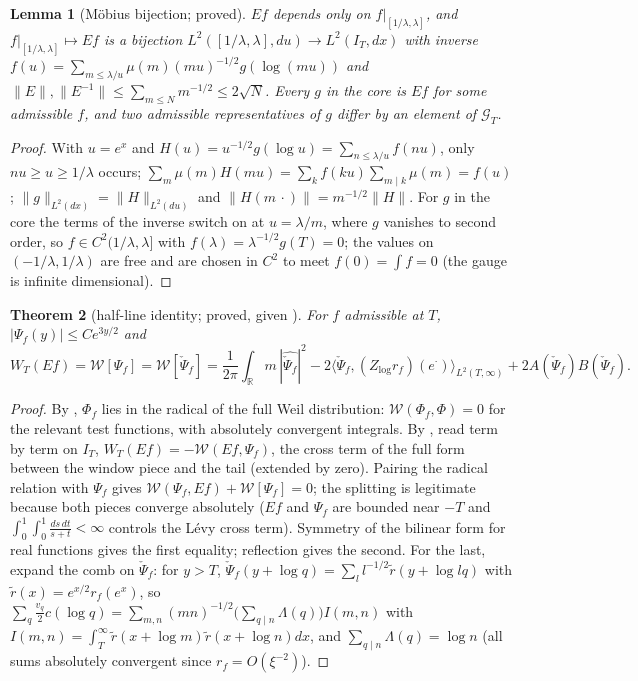 \documentclass[11pt]{amsart}
\newtheorem{theorem}{Theorem}[section]
\newtheorem{lemma}[theorem]{Lemma}
\theoremstyle{definition}
\theoremstyle{remark}
\newcommand{\R}{\mathbb R}
\newcommand{\IT}{I_T}
\begin{document}
\begin{lemma}[M\"obius bijection; proved]\label{lem:ext-mob}
$Ef$ depends only on $f|_{[1/\lambda,\lambda]}$, and $f|_{[1/\lambda,\lambda]}\mapsto Ef$ is a bijection
$L^2([1/\lambda,\lambda],du)\to L^2(\IT,dx)$ with inverse $f(u)=\sum_{m\le\lambda/u}\mu(m)(mu)^{-1/2}g(\log(mu))$ and
$\|E\|,\|E^{-1}\|\le\sum_{m\le N}m^{-1/2}\le2\sqrt N$. Every $g$ in the core is $Ef$ for some admissible $f$, and two
admissible representatives of $g$ differ by an element of $\mathcal G_T$.
\end{lemma}
\begin{proof}
With $u=e^x$ and $H(u)=u^{-1/2}g(\log u)=\sum_{n\le\lambda/u}f(nu)$, only $nu\ge u\ge1/\lambda$ occurs;
$\sum_m\mu(m)H(mu)=\sum_kf(ku)\sum_{m\mid k}\mu(m)=f(u)$; $\|g\|_{L^2(dx)}=\|H\|_{L^2(du)}$ and $\|H(m\,\cdot)\|=m^{-1/2}\|H\|$.
For $g$ in the core the terms of the inverse switch on at $u=\lambda/m$, where $g$ vanishes to second order, so
$f\in C^2(1/\lambda,\lambda]$ with $f(\lambda)=\lambda^{-1/2}g(T)=0$; the values on $(-1/\lambda,1/\lambda)$ are free and are
chosen in $C^2$ to meet $f(0)=\int f=0$ (the gauge is infinite dimensional).
\end{proof}

\begin{theorem}[{half-line identity; proved, given \cite[Lemmas~4.2--4.4, Thm.~4.5]{Guo2026}}]\label{thm:ext-half}
For $f$ admissible at $T$, $|\Psi_f(y)|\le Ce^{3y/2}$ and
\[
W_T(Ef)=\mathcal W[\Psi_f]=\mathcal W[\check\Psi_f]
=\frac1{2\pi}\int_\R m\,|\widehat{\check\Psi_f}|^2-2\big\langle\check\Psi_f,(Z_{\log}r_f)(e^{\cdot})\big\rangle_{L^2(T,\infty)}
+2A(\check\Psi_f)B(\check\Psi_f).
\]
\end{theorem}
\begin{proof}
By \cite[Lemma~4.4]{Guo2026}, $\Phi_f$ lies in the radical of the full Weil distribution: $\mathcal W(\Phi_f,\Phi)=0$ for the
relevant test functions, with absolutely convergent integrals. By \cite[Thm.~4.5]{Guo2026}, read term by term on $\IT$,
$W_T(Ef)=-\mathcal W(Ef,\Psi_f)$, the cross term of the full form between the window piece and the tail (extended by
zero). Pairing the radical relation with $\Psi_f$ gives $\mathcal W(\Psi_f,Ef)+\mathcal W[\Psi_f]=0$; the splitting is
legitimate because both pieces converge absolutely ($Ef$ and $\Psi_f$ are bounded near $-T$ and
$\int_0^1\!\int_0^1\frac{ds\,dt}{s+t}<\infty$ controls the L\'evy cross term). Symmetry of the bilinear form for real
functions gives the first equality; reflection gives the second. For the last, expand the comb on $\check\Psi_f$: for $y>T$,
$\check\Psi_f(y+\log q)=\sum_l l^{-1/2}\tilde r(y+\log lq)$ with $\tilde r(x)=e^{x/2}r_f(e^x)$, so
$\sum_q\frac{v_q}2c(\log q)=\sum_{m,n}(mn)^{-1/2}\big(\sum_{q\mid n}\Lambda(q)\big)I(m,n)$ with
$I(m,n)=\int_T^\infty\tilde r(x+\log m)\tilde r(x+\log n)dx$, and $\sum_{q\mid n}\Lambda(q)=\log n$ (all sums absolutely
convergent since $r_f=O(\xi^{-2})$).
\end{proof}
\end{document}
